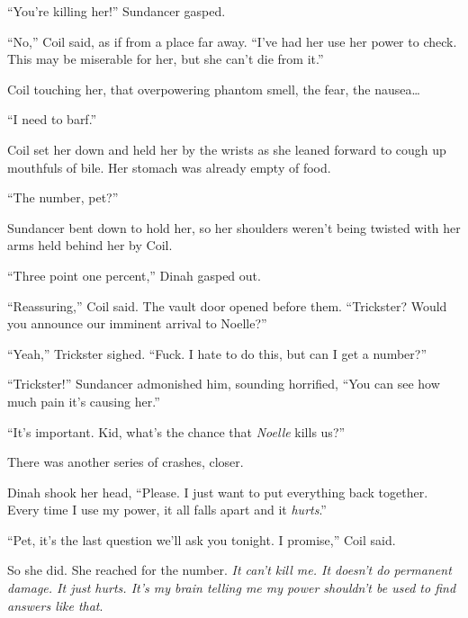 ``You're killing her!'' Sundancer gasped.



``No,'' Coil said, as if from a place far away.  ``I've had her use her power to check.  This may be miserable for her, but she can't die from it.''



Coil touching her, that overpowering phantom smell, the fear, the nausea\ldots



``I need to barf.''



Coil set her down and held her by the wrists as she leaned forward to cough up mouthfuls of bile.  Her stomach was already empty of food.



``The number, pet?''



Sundancer bent down to hold her, so her shoulders weren't being twisted with her arms held behind her by Coil.



``Three point one percent,'' Dinah gasped out.



``Reassuring,'' Coil said.  The vault door opened before them.  ``Trickster?  Would you announce our imminent arrival to Noelle?''



``Yeah,'' Trickster sighed.  ``Fuck.  I hate to do this, but can I get a number?''



``Trickster!'' Sundancer admonished him, sounding horrified, ``You can see how much pain it's causing her.''



``It's important.  Kid, what's the chance that \emph{Noelle} kills us?''



There was another series of crashes, closer.



Dinah shook her head, ``Please.  I just want to put everything back together.  Every time I use my power, it all falls apart and it \emph{hurts}.''



``Pet, it's the last question we'll ask you tonight.  I promise,'' Coil said.



So she did.  She reached for the number.  \emph{It can't kill me.  It doesn't do permanent damage.  It just hurts.  It's my brain telling me my power shouldn't be used to find answers like that}.



